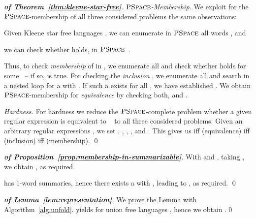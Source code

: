 \documentclass[envcountsame]{llncs}
\newcommand{\PSPACE}{\complexityclass{PSpace}}
\newcommand{\complexityclass}[1]{\ensuremath{\textsc{#1}}\xspace}
\begin{document}
\begin{proof}[\textbf{of Theorem~\ref{thm:kleene-star-free}}]
  \emph{\PSPACE-Membership.} We exploit for the \PSPACE-membership of
  all three considered problems the same observations:
\begin{inparaenum}[\bfseries(1)]
  \item Given Kleene star free languages , we can enumerate in
    \PSPACE all words ,
and
  \item we can check whether  holds, in
    \PSPACE~\cite{DBLP:conf/focs/MeyerS72}.
  \end{inparaenum}
  
  Thus, to check \emph{membership} of  in , we
  enumerate all  and check whether 
  holds for some ~-- if so,  is true. 
For checking the \emph{inclusion}
  , we enumerate all 
  and search in a nested loop for a  with
  .
If such a  exists for all , we have established
  .
We obtain \PSPACE-membership for \emph{equivalence}  by checking both, 
  and .



  \emph{Hardness.} For hardness we reduce the \PSPACE-complete problem
  whether a given regular expression  is
  equivalent to ~\cite{DBLP:conf/focs/MeyerS72} to all three
  considered problems:
Given an arbitrary regular expressions , we set ,
  , , , and
  .
This gives us  iff 
  (equivalence) iff  (inclusion)
  iff  (membership).
\qed
\end{proof}


\begin{proof}[\textbf{of Proposition~\ref{prop:membership-in-summarizable}}]
   With  and , taking
  , we obtain
  , as required.


    has 1-word summaries, hence there exists a  with , leading to
  , as required.  \qed
\end{proof}



\begin{proof}[\textbf{of Lemma~\ref{lem:representation}}]
  We prove the Lemma with Algorithm~\ref{alg:unfold}.
 yields  for
  union free languages , hence we obtain .\qed
\end{proof}
\end{document}

